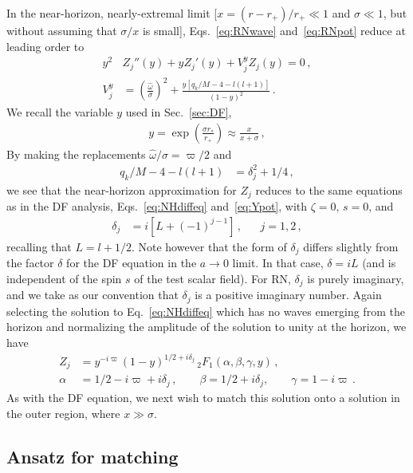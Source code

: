 \begin{refsection}
In the near-horizon, nearly-extremal limit [$x = (r-r_+)/r_+\ll 1$ and $\sigma \ll 1$, but without assuming that $\sigma/x$ is small], Eqs.~\eqref{eq:RNwave} and~\eqref{eq:RNpot} reduce at leading order to 
\begin{align}
y^2 & Z_j''(y) + y Z_j'(y) + V^y_j Z_j (y)= 0\,, \\
V^y_j & = \left(\frac{\hat \omega}{\sigma}\right)^2 +\frac{y[q_k /M -4 - l(l+1)]}{(1-y)^2} \,.
\end{align}
We recall the variable $y$ used in Sec.~\ref{sec:DF}, 
\begin{align}
y = \exp \left( \frac{\sigma r_*} {r_+} \right) \approx \frac{x}{x+\sigma} \,,
\end{align}
By making the replacements $  \hat \omega/\sigma= \varpi / 2 $ and
\begin{align}
 q_k /M -4 - l(l+1) & = \delta_j^2 + 1/4 \,, 
 \end{align}
we see that the near-horizon approximation for $Z_j$ reduces to the same equations as in the DF analysis, Eqs.~\eqref{eq:NHdiffeq} and~\eqref{eq:Ypot}, with $\zeta = 0$, $s = 0$, and 
\begin{align}
\delta_j & = i \left [L + (-1)^{j-1} \right]\,, &&  j  = 1,2\,,
\end{align}
recalling that $L = l+ 1/2$.
Note however that the form of $\delta_j$ differs slightly from the factor $\delta$ for the DF equation in the $a \to 0$ limit. 
In that case, $\delta = i L$ (and is independent of the spin $s$ of the test scalar field). 
For RN, $\delta_j$ is purely imaginary, and we take as our convention that $\delta_j$ is a positive imaginary number.
Again selecting the solution to Eq.~\eqref{eq:NHdiffeq} which has no waves emerging from the horizon and normalizing the amplitude of the solution to unity at the horizon, we have
\begin{align}
\label{eq:RNnearsln}
Z_j & = y^{- i \varpi} (1 - y)^{1/2 + i \delta_j} \, {}_2 F_1\left(\alpha,\beta,\gamma, y \right) \,, \\
\alpha & = 1/2 - i \varpi + i \delta_j \,, \qquad \beta = 1/2 + i \delta_j, \qquad \gamma = 1 - i\varpi \,.
\end{align}
As with the DF equation, we next wish to match this solution onto a solution in the outer region, where $x \gg \sigma$.

\subsection{Ansatz for matching}


\end{refsection}
